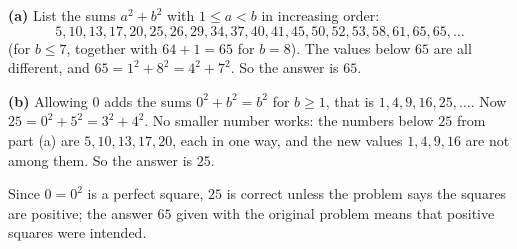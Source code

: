 \textbf{(a)} List the sums $a^2+b^2$ with $1\le a<b$ in increasing order:
\[
5,10,13,17,20,25,26,29,34,37,40,41,45,50,52,53,58,61,65,65,\dots
\]
(for $b\le7$, together with $64+1=65$ for $b=8$). The values below $65$ are all different, and $65=1^2+8^2=4^2+7^2$. So the answer is $\boxed{65}$.

\textbf{(b)} Allowing $0$ adds the sums $0^2+b^2=b^2$ for $b\ge1$, that is $1,4,9,16,25,\dots$. Now $25=0^2+5^2=3^2+4^2$. No smaller number works: the numbers below $25$ from part (a) are $5,10,13,17,20$, each in one way, and the new values $1,4,9,16$ are not among them. So the answer is $\boxed{25}$.

Since $0=0^2$ is a perfect square, $25$ is correct unless the problem says the squares are positive; the answer $65$ given with the original problem means that positive squares were intended.
